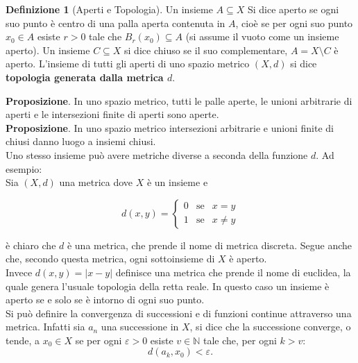 \documentclass[a4paper,twoside]{article}
\renewcommand{\epsilon}{\varepsilon}
\newcommand{\N}{\mathbb{N}}
\theoremstyle{definition}
\newtheorem{definizione}[theorem]{Definizione}
\numberwithin{theorem}{section}
\begin{document}
\begin{definizione}[Aperti e Topologia]
Un insieme $A\subseteq X$ Si dice aperto se ogni suo punto è centro di una palla aperta contenuta in $A$, cioè se per ogni suo punto $x_0\in A$ esiste $r>0$ tale che $B_r(x_0)\subseteq A$ (si assume il vuoto come un insieme aperto). Un insieme $C\subseteq X$ si dice chiuso se il suo complementare, $A=X\setminus C$ è aperto. L'insieme di tutti gli aperti di uno spazio metrico $(X,d)$ si dice \textbf{topologia generata dalla metrica $d$}.
\end{definizione}

\textbf{Proposizione}. In uno spazio metrico, tutti le palle aperte, le unioni arbitrarie di aperti e le intersezioni finite di aperti sono aperte.\\
\textbf{Proposizione}. In uno spazio metrico intersezioni arbitrarie e unioni finite di chiusi danno luogo a insiemi chiusi.\\

Uno stesso insieme può avere metriche diverse a seconda della funzione $d$. Ad esempio: \\
Sia $(X,d)$ una metrica dove $X$ è un insieme e

$$ d(x,y)=\left\{\begin{array}{ccl} 0 &\text{se} & x=y\\ 1 &\text{se} & x\neq y\end{array}\right. $$

è chiaro che $d$ è una metrica, che prende il nome di metrica discreta. Segue anche che, secondo questa metrica, ogni sottoinsieme di $X$ è aperto.\\
Invece $d(x,y)=|x-y|$ definisce una metrica che prende il nome di euclidea, la quale genera l'usuale topologia della retta reale. In questo caso un insieme è aperto se e solo se è intorno di ogni suo punto.\\
Si può definire la convergenza di successioni e di funzioni continue attraverso una metrica. Infatti sia $a_n$ una successione in $X$, si dice che la successione converge, o tende, a $x_0\in X$ se per ogni $\epsilon>0$ esiste $v\in \N$ tale che, per ogni $k>v$: \\
$$d(a_k,x_0)<\epsilon.$$
\end{document}
